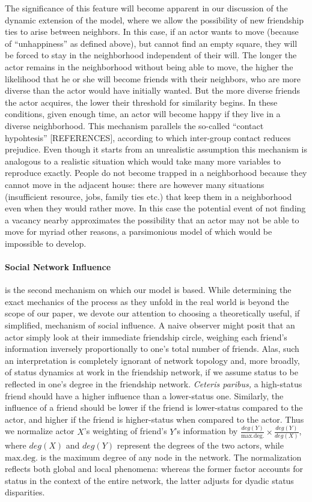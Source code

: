 \documentclass[a4paper,10pt]{article}
\begin{document}
The significance of this feature will become apparent in our discussion of the dynamic extension of the model, where we allow the possibility of new friendship ties to arise between neighbors. In this case, if an actor wants to move (because of ``unhappiness'' as defined above), but cannot find an empty square, they will be forced to stay in the neighborhood independent of their will. The longer the actor remains in the neighborhood without being able to move, the higher the likelihood that he or she will become friends with their neighbors, who are more diverse than the actor would have initially wanted. But the more diverse friends the actor acquires, the lower their threshold for similarity begins. In these conditions, given enough time, an actor will become happy if they live in a diverse neighborhood. This mechanism parallels the so-called ``contact hypohtesis'' [REFERENCES], according to which inter-group contact reduces prejudice. Even though it starts from an unrealistic assumption this mechanism is analogous to a realistic situation which would take many more variables to reproduce exactly. People do not become trapped in a neighborhood because they cannot move in the adjacent house: there are however many situations (insufficient resource, jobs, family ties etc.) that keep them in a neighborhood even when they would rather move. In this case the potential event of not finding a vacancy nearby approximates the possibility that an actor may not be able to move for myriad other reasons, a parsimonious model of which would be impossible to develop. 

 

\paragraph{Social Network Influence} is the second mechanism on which our model is based. While determining the exact mechanics of the process as they unfold in the real world is beyond the scope of our paper, we devote our attention to choosing a theoretically useful, if simplified, mechanism of social influence. A naive observer might posit that an actor  simply look at their immediate friendship circle, weighing each friend's information inversely proportionally to one's total number of friends. Alas, such an interpretation is completely ignorant of network topology and, more broadly, of status dynamics at work in the friendship network, if we assume status to be reflected in one's degree in the friendship network. \textit{Ceteris paribus,} a high-status friend should have a higher influence than a lower-status one. Similarly, the influence of a friend should be lower if the friend is lower-status compared to the actor, and higher if the friend is higher-status when compared to the actor. Thus we normalize actor $X$'s weighting of friend's $Y$'s information by $\frac{deg(Y)}{\mathrm{max.deg.}} \times \frac{deg(Y)}{deg(X)}$, where $deg(X)$ and $deg(Y)$ represent the degrees of the two actors, while $\mathrm{max.deg.}$ is the maximum degree of any node in the network. The normalization reflects both global and local phenomena: whereas the former factor accounts for status in the context of the entire network, the latter adjusts for dyadic status disparities.
\end{document}
